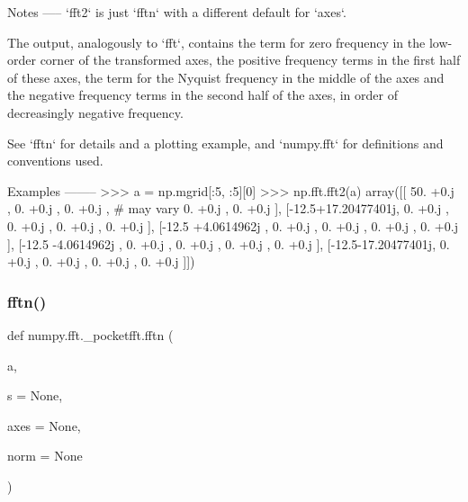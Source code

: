 \begin{DoxyVerb}
Notes
-----
`fft2` is just `fftn` with a different default for `axes`.

The output, analogously to `fft`, contains the term for zero frequency in
the low-order corner of the transformed axes, the positive frequency terms
in the first half of these axes, the term for the Nyquist frequency in the
middle of the axes and the negative frequency terms in the second half of
the axes, in order of decreasingly negative frequency.

See `fftn` for details and a plotting example, and `numpy.fft` for
definitions and conventions used.


Examples
--------
>>> a = np.mgrid[:5, :5][0]
>>> np.fft.fft2(a)
array([[ 50.  +0.j        ,   0.  +0.j        ,   0.  +0.j        , # may vary
          0.  +0.j        ,   0.  +0.j        ],
       [-12.5+17.20477401j,   0.  +0.j        ,   0.  +0.j        ,
          0.  +0.j        ,   0.  +0.j        ],
       [-12.5 +4.0614962j ,   0.  +0.j        ,   0.  +0.j        ,
          0.  +0.j        ,   0.  +0.j        ],
       [-12.5 -4.0614962j ,   0.  +0.j        ,   0.  +0.j        ,
          0.  +0.j        ,   0.  +0.j        ],
       [-12.5-17.20477401j,   0.  +0.j        ,   0.  +0.j        ,
          0.  +0.j        ,   0.  +0.j        ]])\end{DoxyVerb}
 \mbox{\label{namespacenumpy_1_1fft_1_1__pocketfft_af0149dee6ab2d37a65bdd9cb306e0684}} 
\subsubsection{\texorpdfstring{fftn()}{fftn()}}
{\footnotesize\ttfamily def numpy.\+fft.\+\_\+pocketfft.\+fftn (\begin{DoxyParamCaption}\item[{}]{a,  }\item[{}]{s = {\ttfamily None},  }\item[{}]{axes = {\ttfamily None},  }\item[{}]{norm = {\ttfamily None} }\end{DoxyParamCaption})}

